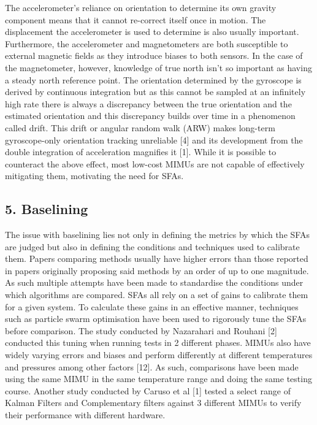 \documentclass[10pt]{report}
\begin{document}
The accelerometer’s reliance on orientation to determine its own gravity component means that it cannot re-correct itself once in motion. The displacement the accelerometer is used to determine is also usually important. Furthermore, the accelerometer and magnetometers are both susceptible to external magnetic fields as they introduce biases to both sensors. In the case of the magnetometer, however, knowledge of true north isn’t so important as having a steady north reference point. The orientation determined by the gyroscope is derived by continuous integration but as this cannot be sampled at an infinitely high rate there is always a discrepancy between the true orientation and the estimated orientation and this discrepancy builds over time in a phenomenon called drift. This drift or angular random walk (ARW) makes long-term gyroscope-only orientation tracking unreliable [4] and its development from the double integration of acceleration magnifies it [1].
\newline
While it is possible to counteract the above effect, most low-cost MIMUs are not capable of effectively mitigating them, motivating the need for SFAs.

\subsection*{5. Baselining}
The issue with baselining lies not only in defining the metrics by which the SFAs are judged but also in defining the conditions and techniques used to calibrate them. Papers comparing methods usually have higher errors than those reported in papers originally proposing said methods by an order of up to one magnitude. As such multiple attempts have been made to standardise the conditions under which algorithms are compared. SFAs all rely on a set of gains to calibrate them for a given system. To calculate these gains in an effective manner, techniques such as particle swarm optimisation have been used to rigorously tune the SFAs before comparison. The study conducted by Nazarahari and Rouhani [2] conducted this tuning when running tests in 2 different phases. MIMUs also have widely varying errors and biases and perform differently at different temperatures and pressures among other factors [12]. As such, comparisons have been made using the same MIMU in the same temperature range and doing the same testing course. Another study conducted by Caruso et al [1] tested a select range of Kalman Filters and Complementary filters against 3 different MIMUs to verify their performance with different hardware.
\end{document}

